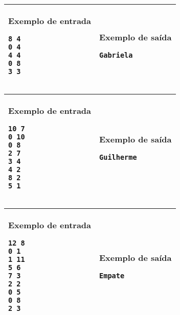\begin{table}[!h]
\centering
\begin{tabular}{|l|l|}
\hline
\begin{minipage}[t]{3in}
\textbf{Exemplo de entrada}
\begin{verbatim}
8 4
0 4
4 4
0 8
3 3
\end{verbatim}
\vspace{1mm}
\end{minipage}
&
\begin{minipage}[t]{3in}
\textbf{Exemplo de saída}
\begin{verbatim}
Gabriela
\end{verbatim}
\vspace{1mm}
\end{minipage} \\
\hline
\end{tabular}
\end{table}

\begin{table}[!h]
\centering
\begin{tabular}{|l|l|}
\hline
\begin{minipage}[t]{3in}
\textbf{Exemplo de entrada}
\begin{verbatim}
10 7
0 10
0 8
2 7
3 4
4 2
8 2
5 1
\end{verbatim}
\vspace{1mm}
\end{minipage}
&
\begin{minipage}[t]{3in}
\textbf{Exemplo de saída}
\begin{verbatim}
Guilherme
\end{verbatim}
\vspace{1mm}
\end{minipage} \\
\hline
\end{tabular}
\end{table}

\begin{table}[!h]
\centering
\begin{tabular}{|l|l|}
\hline
\begin{minipage}[t]{3in}
\textbf{Exemplo de entrada}
\begin{verbatim}
12 8
0 1
1 11
5 6
7 3
2 2
0 5
0 8
2 3
\end{verbatim}
\vspace{1mm}
\end{minipage}
&
\begin{minipage}[t]{3in}
\textbf{Exemplo de saída}
\begin{verbatim}
Empate
\end{verbatim}
\vspace{1mm}
\end{minipage} \\
\hline
\end{tabular}
\end{table}
